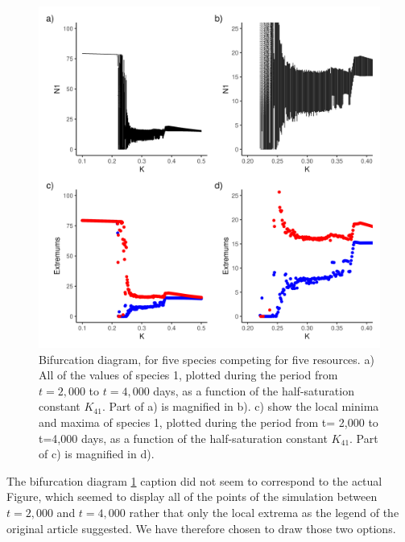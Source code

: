 \begin{figure}[H]
\begin{center} 
 \includegraphics[width=1\textwidth]{../Code/Figures/Figure_3.png}
  \caption{Bifurcation diagram, for five species competing for five resources. a) All of the values of species 1, plotted during the period from $t=2,000$ to $t=4,000$ days, as a function of the half-saturation constant $K_{41}$. Part of a) is magnified in b). c) show the local minima and maxima of species 1, plotted during the period from t= 2,000 to t=4,000 days, as a function of the half-saturation constant $K_{41}$. Part of c) is magnified in d).}
  \label{figures:Fig3}
\end{center}
\end{figure}

The bifurcation diagram \ref{figures:Fig3} caption did not seem to correspond to the actual Figure, which seemed to display all of the points of the simulation between $t=2,000$ and $t=4,000$ rather that only the local extrema as the legend of the original article suggested. We have therefore chosen to draw those two options. 

